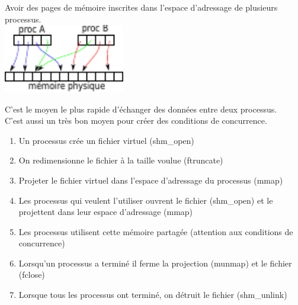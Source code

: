  Avoir des pages de mémoire inscrites dans l'espace d'adressage de plusieurs processus.\\
\includegraphics[width=200px]{fig19.pdf}

 C'est le moyen le plus rapide d'échanger des données entre deux processus.\\

 C'est aussi un très bon moyen pour créer des conditions de concurrence.\\

\begin{enumerate}
	\item Un processus crée un fichier virtuel (shm\_open)
	\item On redimensionne le fichier à la taille voulue (ftruncate)
	\item Projeter le fichier virtuel dans l'espace d'adressage du processus (mmap)
	\item Les processus qui veulent l'utiliser ouvrent le fichier (shm\_open) et le projettent dans leur espace d'adressage (mmap)
	\item Les processus utilisent cette mémoire partagée (attention aux conditions de concurrence)
	\item Lorsqu'un processus a terminé il ferme la projection (munmap) et le fichier (fclose)
	\item Lorsque tous les processus ont terminé, on détruit le fichier (shm\_unlink)
\end{enumerate}
